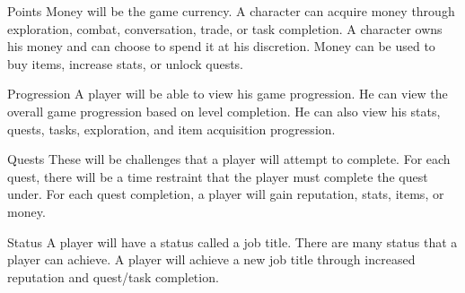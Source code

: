 \documentclass[12pt]{article}
\begin{document}

\begin{section}{Points}
Money will be the game currency. A character can acquire money through
exploration, combat, conversation, trade, or task completion. A character owns
his money and can choose to spend it at his discretion. Money can be used to buy
items, increase stats, or unlock quests.
\end{section}

\begin{section}{Progression}
A player will be able to view his game progression. He can view the overall game
progression based on level completion. He can also view his stats, quests,
tasks, exploration, and item acquisition progression.
\end{section}

\begin{section}{Quests}
These will be challenges that a player will attempt to complete. For each quest,
there will be a time restraint that the player must complete the quest under.
For each quest completion, a player will gain reputation, stats, items, or
money.
\end{section}

\begin{section}{Status}
A player will have a status called a job title. There are many status that a
player can achieve. A player will achieve a new job title through increased
reputation and quest/task completion.
\end{section}
\end{document}
